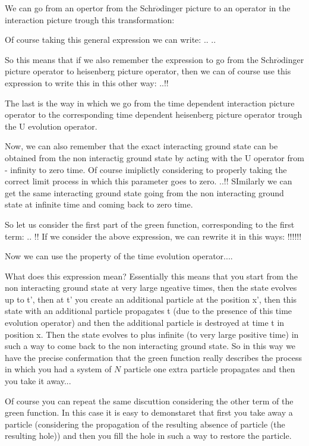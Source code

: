 \documentclass[../main/main.tex]{subfiles}
\begin{document}
We can go from an opertor from the Schr$\ddot{o}$dinger picture to an operator in the interaction picture trough this transformation:


Of course taking this general expression we can write:
..
..

So this means that if we also remember the expression to go from the Schr$\ddot{o}$dinger picture operator to heisenberg picture operator, then we can of course use this expression to write this in this other way:
..!!


The last is the way in which we go from the time dependent interaction picture operator to the corresponding time dependent heisenberg picture operator trough the U evolution operator.


Now, we can also remember that the exact interacting ground state can be obtained from the non interactig ground state by acting with the U operator from - infinity to zero time. Of course imiplictly considering to properly taking the correct limit process in which this parameter goes to zero.
..!!
SImilarly we can get the same interacting ground state going from the non interacting ground state at infinite time and coming back to zero time.


So let us consider the first part of the green function, corresponding to the first term:
.. !!
If we consider the above expression, we can rewrite it in this ways: !!!!!!

Now we can use the property of the time evolution operator....

What does this expression mean? Essentially this means that you start from the non interacting ground state at very large ngeative times, then the state evolves up to t', then at t' you create an additional particle at the position x', then this state with an additional particle propagates t (due to the presence of this time evolution operator) and then the additional particle is destroyed at time t in position x. Then the state evolves to plus infinite (to very large positive time) in such a way to come back to the non interacting ground state. So in this way we have the precise confermation that the green function really describes the process in which you had a system of \( N \) particle one extra particle propagates and then you take it away...



Of course you can repeat the same discuttion considering the other term of the green function. In this case it is easy to demonstaret that first you take away a particle (considering the propagation of the resulting absence of particle (the resulting hole)) and then you fill the hole in such a way to restore the particle.
\end{document}
